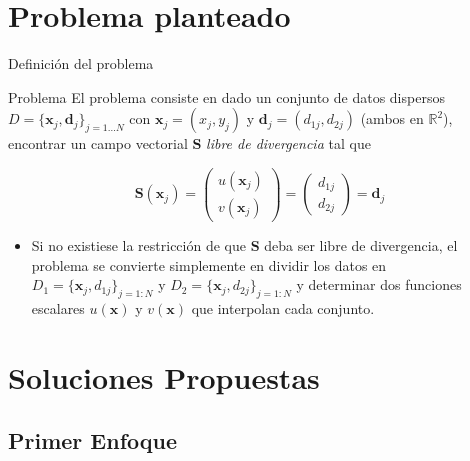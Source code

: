 \documentclass{beamer}
\begin{document}
\section{Problema planteado}

\begin{frame}{Definición del problema}
 
  \begin{block}{Problema}
    El problema consiste en dado un conjunto de datos dispersos $D=\{\mathbf{x}_j, \mathbf{d}_j \}_{j=1 \ldots N}$ con $\mathbf{x}_j=(x_j,y_j)$ y $\mathbf{d}_j = (d_{1j},d_{2j})$ (ambos en $\mathbb{R}^2$), encontrar un campo vectorial $\mathbf{S}$ \textit{libre de divergencia} tal que

    $$ \mathbf{S}(\mathbf{x}_j)=
    \begin{pmatrix} u(\mathbf{x}_j)\\v(\mathbf{x}_j)\end{pmatrix}=
    \begin{pmatrix} d_{1j} \\ d_{2j} \end{pmatrix}=
    \mathbf{d}_j
     $$
  \end{block}

  \begin{itemize}
  \item {
    Si no existiese la restricción de que $\mathbf{S}$ deba ser libre de divergencia, el problema se convierte simplemente
    en dividir los datos en $D_1=\{\mathbf{x}_j, d_{1j} \}_{j=1:N}$ y $D_2=\{\mathbf{x}_j, d_{2j} \}_{j=1:N}$ y
    determinar dos funciones escalares $u(\mathbf{x})$ y $v(\mathbf{x})$ que interpolan cada conjunto.
  }
  \end{itemize}
\end{frame}




\section{Soluciones Propuestas}

\subsection{Primer Enfoque}
\end{document}
